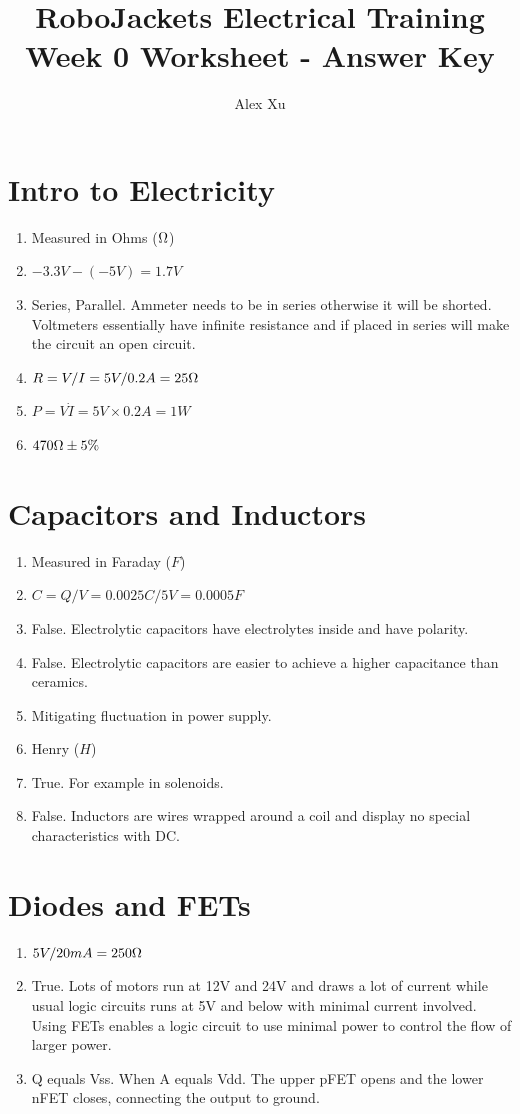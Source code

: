 \documentclass{article}
\title{RoboJackets Electrical Training Week 0 Worksheet - Answer Key}
\author{Alex Xu}
\begin{document}
\maketitle{}
\setcounter{tocdepth}{2}
\tableofcontents


\pagebreak

\section{Intro to Electricity}
\begin{enumerate}
	\item Measured in Ohms ($\ohm$)
	\item $-3.3V-(-5V)=1.7V$
	\item Series, Parallel. Ammeter needs to be in series otherwise it will be shorted. Voltmeters essentially have infinite resistance and if placed in series will make the circuit an open circuit.
	\item $R=V/I=5V/0.2A=25\ohm$
	\item $P=V\dot I = 5V \times 0.2 A = 1W$
	\item $470\ohm \pm 5\%$
\end{enumerate}

\section{Capacitors and Inductors}
\begin{enumerate}
	\item Measured in Faraday ($F$)
	\item $C=Q/V=0.0025C/5V=0.0005F$
	\item False. Electrolytic capacitors have electrolytes inside and have polarity.
	\item False. Electrolytic capacitors are easier to achieve a higher capacitance than ceramics.
	\item Mitigating fluctuation in power supply.
	\item Henry ($H$)
	\item True. For example in solenoids.
	\item False. Inductors are wires wrapped around a coil and display no special characteristics with DC.
\end{enumerate}

\section{Diodes and FETs}
\begin{enumerate}
	\item $5V/20mA=250\ohm$
	\item True. Lots of motors run at 12V and 24V and draws a lot of current while usual logic circuits runs at 5V and below with minimal current involved. Using FETs enables a logic circuit to use minimal power to control the flow of larger power.
	\item Q equals Vss. When A equals Vdd. The upper pFET opens and the lower nFET closes, connecting the output to ground.
\end{enumerate}
\end{document}
